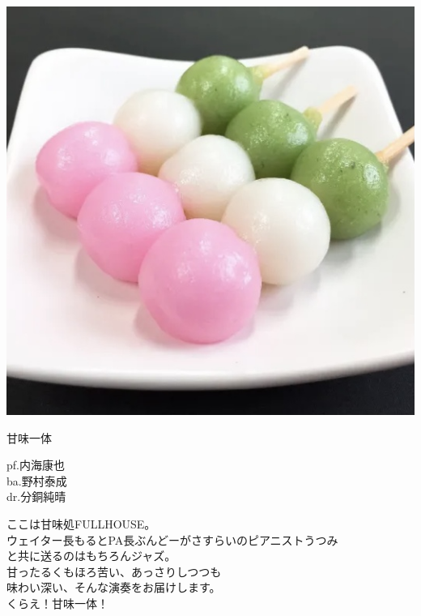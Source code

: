 \documentclass[a4paper]{article}
\begin{document}
\begin{minipage}{0.25\textheight}
    \flushleft
    \includegraphics[width=0.25\textheight]{./FULLHOUSE/resources/11.jpeg}
\end{minipage}
\begin{minipage}{\textwidth - 0.25\textheight}
    \flushleft
    \Huge \vspace{1em}甘味一体\vspace{1em}\normalsize \\
    \begin{minipage}{11em}
        \flushleft
        \Large
        pf.内海康也\\ba.野村泰成\\dr.分銅純晴
    \end{minipage}
    \begin{minipage}{\textwidth - 18em}
        \flushleft
        \large
        ここは甘味処FULLHOUSE。\\ウェイター長もるとPA長ぶんどーがさすらいのピアニストうつみ\\と共に送るのはもちろんジャズ。\\甘ったるくもほろ苦い、あっさりしつつも\\味わい深い、そんな演奏をお届けします。\\くらえ！甘味一体！
    \end{minipage}
\end{minipage}
\end{document}
